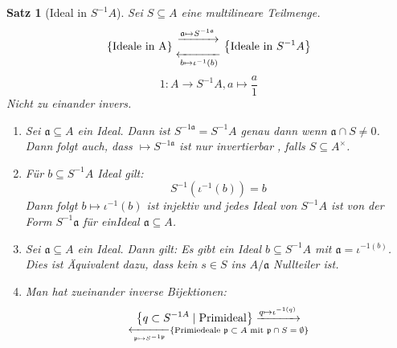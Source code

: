 \documentclass[10pt,a4paper]{article}
\newcounter{thm}[section]
\theoremstyle{definition}
\theoremstyle{plain}
\newtheorem{satz}[thm]{Satz}
\theoremstyle{remark}
\begin{document}
\begin{satz}[Ideal in $S^{-1}A$]
	Sei $S\subseteq A$ eine multilineare Teilmenge.
	\begin{align*}
	\left\{\text{Ideale in A}\right\}
	{\xrightarrow{\mathfrak a\mapsto S^{-1\mathfrak a}}\atop \xleftarrow[b\mapsto \iota^{-1}(b)]{}
	}\left\{\text{Ideale in $S^{-1}A$}\right\}
	\end{align*}
	\[1:A\rightarrow S^{-1}A,a\mapsto \frac{a}{1}\]
	Nicht zu einander invers.
	\begin{enumerate}
		\item Sei $\mathfrak a\subseteq A$ ein Ideal. Dann ist $S^{-1\mathfrak a}=S^{-1}A$ genau dann wenn $\mathfrak a\cap S\neq 0$.\\
		Dann folgt auch, dass $\mathfrak\mapsto S^{-1\mathfrak a}$ ist nur invertierbar , falls $S\subseteq A^\times$.
		\item Für $b\subseteq S^{-1}A$ Ideal gilt:\\
		\[S^{-1}(\iota^{-1}(b))=b\]
		Dann folgt $b\mapsto\iota^{-1}(b)$ ist injektiv und jedes Ideal von $S^{-1}A$ ist von der Form $S^{-1}\mathfrak a$ für einIdeal $\mathfrak a\subseteq A$.
		\item Sei $\mathfrak a\subseteq A$ ein Ideal. Dann gilt:
		Es gibt ein Ideal $b\subseteq S^{-1}A$ mit $\mathfrak a=\iota^{-1(b)}$.\\
		Dies ist Äquivalent dazu, dass kein $s\in S$ ins $A/\mathfrak a$ Nullteiler ist.
		\item Man hat zueinander inverse Bijektionen: \label{4104}
		\[\left\{q\subset S^{-1 A}\mid \text{Primideal}\right\}
		\xrightarrow{q\mapsto\iota^{-1(q)}}\atop\xleftarrow[\mathfrak p\mapsto S^{-1\mathfrak p}]{}\left\{\text{Primiedeale $\mathfrak p\subset A$ mit $\mathfrak p\cap S=\emptyset$}\right\}
		\]
	\end{enumerate}
\end{satz}
\end{document}
